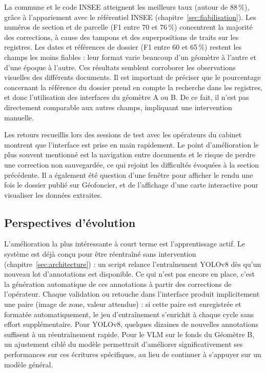 La commune et le code INSEE atteignent les meilleurs taux (autour de 88\,\%), grâce à l'appariement avec le référentiel INSEE (chapitre~\ref{sec:fiabilisation}). Les numéros de section et de parcelle (F1 entre 70 et 76\,\%) concentrent la majorité des corrections, à cause des tampons et des superpositions de traits sur les registres. Les dates et références de dossier (F1 entre 60 et 65\,\%) restent les champs les moins fiables : leur format varie beaucoup d'un géomètre à l'autre et d'une époque à l'autre. Ces résultats semblent corroborer les observations visuelles des différents documents. Il est important de préciser que le pourcentage concernant la référence du dossier prend en compte la recherche dans les registres, et donc l'utilisation des interfaces du géomètre A ou B. De ce fait, il n'est pas directement comparable aux autres champs, impliquant une intervention manuelle.

Les retours recueillis lors des sessions de test avec les opérateurs du cabinet montrent que l'interface est prise en main rapidement. Le point d'amélioration le plus souvent mentionné est la navigation entre documents et le risque de perdre une correction non sauvegardée, ce qui rejoint les difficultés évoquées à la section précédente. Il a également été question d'une fenêtre pour afficher le rendu une fois le dossier publié sur Géofoncier, et de l'affichage d'une carte interactive pour visualiser les données extraites.


\subsection{Perspectives d'évolution}

L'amélioration la plus intéressante à court terme est l'apprentissage actif. Le système est déjà conçu pour être réentraîné sans intervention (chapitre~\ref{sec:architecture}) : un script relance l'entraînement YOLOv8 dès qu'un nouveau lot d'annotations est disponible. Ce qui n'est pas encore en place, c'est la génération automatique de ces annotations à partir des corrections de l'opérateur. Chaque validation ou retouche dans l'interface produit implicitement une paire (image de zone, valeur attendue) : si cette paire est enregistrée et formatée automatiquement, le jeu d'entraînement s'enrichit à chaque cycle sans effort supplémentaire. Pour YOLOv8, quelques dizaines de nouvelles annotations suffisent à un réentraînement rapide. Pour le VLM sur le fonds du Géomètre B, un ajustement ciblé du modèle permettrait d'améliorer significativement ses performances sur ces écritures spécifiques, au lieu de continuer à s'appuyer sur un modèle général.

